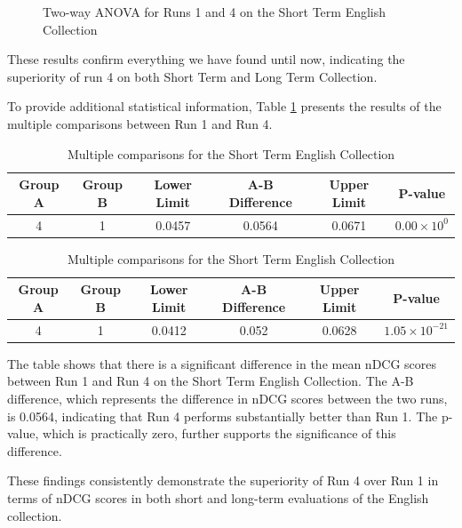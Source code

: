 \begin{figure}[!h]
\begin{subfigure}[b]{0.49\textwidth}
        \label{fig:st_anova_eng_ap}
    \end{subfigure}
    \caption{Two-way ANOVA for Runs 1 and 4 on the Short Term English Collection}
    \label{fig:st_anova_eng}
\end{figure}
 
These results confirm everything we have found until now, indicating the superiority of run 4 on both Short Term and Long Term Collection.

To provide additional statistical information, Table \ref{table:st_anova_eng} presents the results of the multiple comparisons between Run 1 and Run 4.

\begin{table}[!h]
    \centering
    \caption{Multiple comparisons for the Short Term English Collection}
    \label{table:st_anova_eng}
    \begin{tabular}{cccccc}
    \hline
    Group A & Group B & Lower Limit & A-B Difference & Upper Limit & P-value \\
    \hline
    4 & 1 & 0.0457 & 0.0564 & 0.0671 & $0.00 \times 10^{0}$ \\
    \hline
    \end{tabular}
\end{table}

\begin{table}[!h]
    \centering
    \caption{Multiple comparisons for the Short Term English Collection}
    \label{table:st_anova_eng_ap}
    \begin{tabular}{cccccc}
    \hline
    Group A & Group B & Lower Limit & A-B Difference & Upper Limit & P-value \\
    \hline
    4 & 1 & 0.0412 & 0.052 & 0.0628 & $1.05 \times 10^{-21}$ \\
    \hline
    \end{tabular}
\end{table}

The table shows that there is a significant difference in the mean \ac{nDCG} scores between Run 1 and Run 4 on the Short Term English Collection. 
The A-B difference, which represents the difference in \ac{nDCG} scores between the two runs, is 0.0564, indicating that Run 4 performs substantially better than Run 1. 
The p-value, which is practically zero, further supports the significance of this difference.

These findings consistently demonstrate the superiority of Run 4 over Run 1 in terms of \ac{nDCG} scores in both short and long-term evaluations of the English collection.


